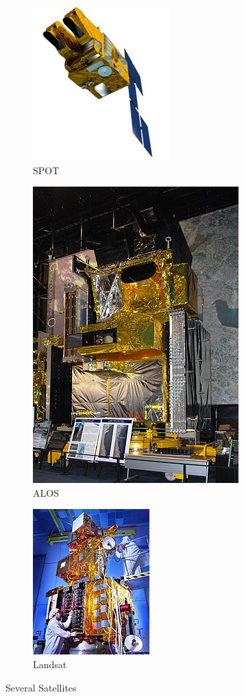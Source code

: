 \begin{figure}[htbp!]
    \centering
    \begin{subfigure}[b]{0.15\textwidth}
        \centering
        \includegraphics[height=0.1\textheight]{figs/Spot-5.jpg}
        \caption{SPOT}
    \end{subfigure}
    \begin{subfigure}[b]{0.15\textwidth}
        \centering
        \includegraphics[height=0.1\textheight]{figs/AlOS.jpg}
        \caption{ALOS}
    \end{subfigure}
    \begin{subfigure}[b]{0.15\textwidth}
        \centering
        \includegraphics[height=0.1\textheight]{figs/Landsat7photo.jpg}
        \caption{Landsat}
    \end{subfigure}
    \caption{Several Satellites}
\end{figure}
